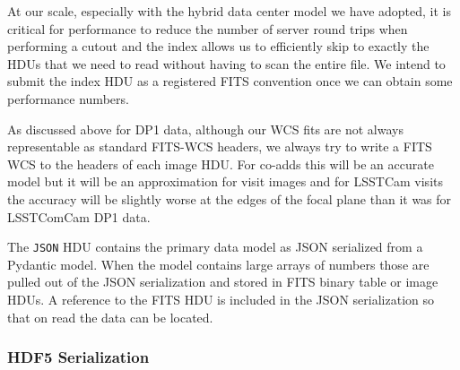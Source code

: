 At our scale, especially with the hybrid data center model we have adopted,\cite{2024SPIE13101E..2BO} it is critical for performance to reduce the number of server round trips when performing a cutout\cite{DMTN-208} and the index allows us to efficiently skip to exactly the HDUs that we need to read without having to scan the entire file.
We intend to submit the index HDU as a registered FITS convention once we can obtain some performance numbers.

As discussed above for DP1 data, although our WCS fits are not always representable as standard FITS-WCS headers, we always try to write a FITS WCS to the headers of each image HDU.
For co-adds this will be an accurate model but it will be an approximation for visit images and for LSSTCam visits the accuracy will be slightly worse at the edges of the focal plane than it was for LSSTComCam DP1 data.

The \texttt{JSON} HDU contains the primary data model as JSON serialized from a Pydantic model.
When the model contains large arrays of numbers those are pulled out of the JSON serialization and stored in FITS binary table or image HDUs.
A reference to the FITS HDU is included in the JSON serialization so that on read the data can be located.

\subsubsection{HDF5 Serialization}


